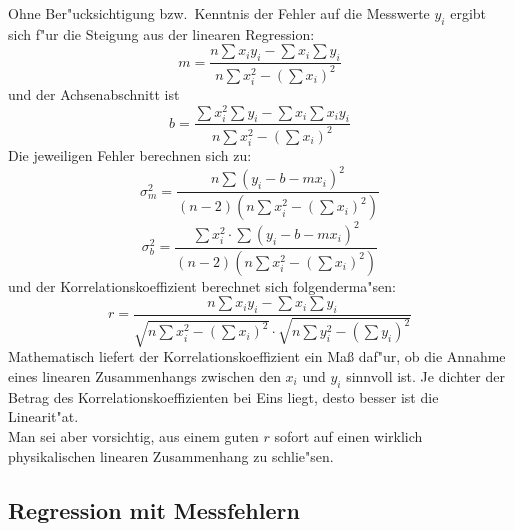 Ohne Ber"ucksichtigung bzw.~Kenntnis der Fehler auf die Messwerte 
$y_i$ ergibt sich f"ur die Steigung aus der linearen Regression:
%
\begin{equation}
m = \frac{{n\sum {x_i y_i  - \sum {x_i \sum {y_i } } } }}{{n\sum
{x_i^2  - \left( {\sum {x_i } } \right)^2 } }}
\end{equation}
%
und der Achsenabschnitt ist
%
\begin{equation}
b = \frac{{\sum {x_i^2 \sum {y_i }  - \sum {x_i \sum {x_i y_i } }
} }}{{n\sum {x_i^2  - \left( {\sum {x_i } } \right)^2 } }}
\end{equation}
%
Die jeweiligen Fehler berechnen sich zu:
%
\begin{equation}
\sigma_m^2  = \frac{{n\sum {\left( {y_i  - b - mx_i } \right)^2 }
}}{{\left( {n - 2} \right)\left( {n\sum {x_i^2  - \left( {\sum
{x_i } } \right)^2 } } \right)}}
\end{equation}
%
\begin{equation}
\sigma_b^2  = \frac{{\sum {x_i^2  \cdot } \sum {\left( {y_i  - b -
mx_i } \right)^2 } }}{{\left( {n - 2} \right)\left( {n\sum {x_i^2
- \left( {\sum {x_i } } \right)^2 } } \right)}}
\end{equation}
%
und der Korrelationskoeffizient
berechnet sich folgenderma"sen:
%
\begin{equation}
 r = \frac{
 {n\sum {x_i y_i  - \sum {x_i \sum {y_i } } } }
 }
 {
 {\sqrt{n\sum {x_i^2  - \left( {\sum {x_i } } \right)^2 }} \cdot
  \sqrt{n\sum {y_i^2  - \left( {\sum {y_i } } \right)^2 } } }
 }
\end{equation}
%
Mathematisch liefert der Korrelationskoeffizient ein Ma{\ss} daf"ur, ob die Annahme eines linearen Zusammenhangs zwischen den $x_i$ und $y_i$ sinnvoll ist. Je dichter der Betrag des Korrelationskoeffizienten bei Eins liegt, desto besser ist die Linearit"at.\\
Man sei aber vorsichtig, aus einem guten $r$ sofort auf einen
wirklich physikalischen linearen Zusammenhang zu schlie"sen.

\subsection{Regression mit Messfehlern} \label{v:LinRegErr}

